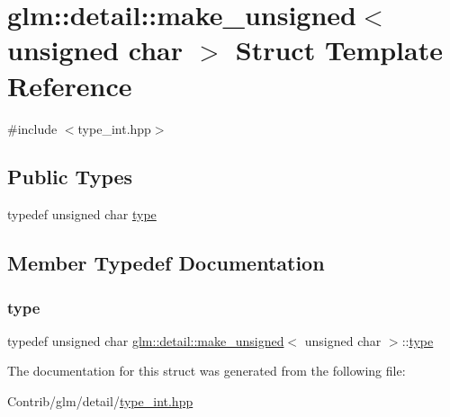 \hypertarget{structglm_1_1detail_1_1make__unsigned_3_01unsigned_01char_01_4}{}\section{glm\+:\+:detail\+:\+:make\+\_\+unsigned$<$ unsigned char $>$ Struct Template Reference}
\label{structglm_1_1detail_1_1make__unsigned_3_01unsigned_01char_01_4}


{\ttfamily \#include $<$type\+\_\+int.\+hpp$>$}

\subsection*{Public Types}
\begin{DoxyCompactItemize}
\item 
typedef unsigned char \mbox{\hyperlink{structglm_1_1detail_1_1make__unsigned_3_01unsigned_01char_01_4_a783a55dc0559d4b972a0d85cf08256f2}{type}}
\end{DoxyCompactItemize}


\subsection{Member Typedef Documentation}
\mbox{\label{structglm_1_1detail_1_1make__unsigned_3_01unsigned_01char_01_4_a783a55dc0559d4b972a0d85cf08256f2}} 
\subsubsection{\texorpdfstring{type}{type}}
{\footnotesize\ttfamily typedef unsigned char \mbox{\hyperlink{structglm_1_1detail_1_1make__unsigned}{glm\+::detail\+::make\+\_\+unsigned}}$<$ unsigned char $>$\+::\mbox{\hyperlink{structglm_1_1detail_1_1make__unsigned_3_01unsigned_01char_01_4_a783a55dc0559d4b972a0d85cf08256f2}{type}}}



The documentation for this struct was generated from the following file\+:\begin{DoxyCompactItemize}
\item 
Contrib/glm/detail/\mbox{\hyperlink{type__int_8hpp}{type\+\_\+int.\+hpp}}\end{DoxyCompactItemize}
